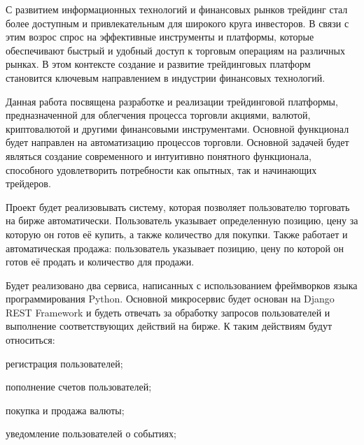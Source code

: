 \label{sec:intro}


С развитием информационных технологий и финансовых рынков трейдинг стал более доступным и привлекательным для широкого круга инвесторов.
В связи с этим возрос спрос на эффективные инструменты и платформы, которые обеспечивают быстрый и удобный доступ к торговым операциям на различных рынках.
В этом контексте создание и развитие трейдинговых платформ становится ключевым направлением в индустрии финансовых технологий.

Данная работа посвящена разработке и реализации трейдинговой платформы, предназначенной для облегчения процесса торговли акциями, валютой, криптовалютой и другими финансовыми инструментами.
Основной функционал будет направлен на автоматизацию процессов торговли.
Основной задачей будет являться создание современного и интуитивно понятного функционала, способного удовлетворить потребности как опытных, так и начинающих трейдеров.

Проект будет реализовывать систему, которая позволяет пользователю торговать на бирже автоматически.
Пользователь указывает определенную позицию, цену за которую он готов её купить, а также количество для покупки.
Также работает и автоматическая продажа: пользователь указывает позицию, цену по которой он готов её продать и количество для продажи.

Будет реализовано два сервиса, написанных с использованием фреймворков языка программирования Python.
Основной микросервис будет основан на Django REST Framework и будеть отвечать за обработку запросов пользователей и выполнение соответствующих действий на бирже.
К таким действиям будут относиться:
\begin{enumerate_num}
    \item регистрация пользователей;
    \item пополнение счетов пользователей;
    \item покупка и продажа валюты;
    \item уведомление пользователей о событиях;
\end{enumerate_num}

